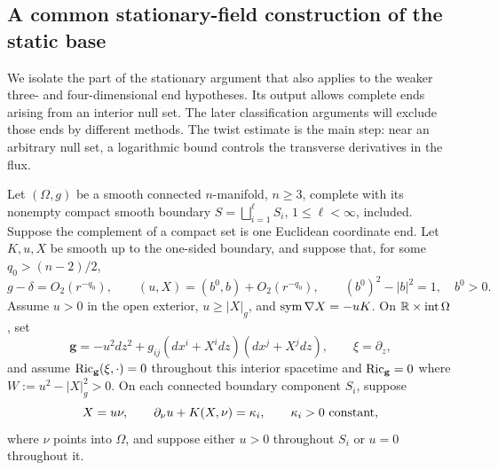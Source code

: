 \subsection{A common stationary-field construction of the static base}
\label{subsec:static:common-base}

We isolate the part of the stationary argument that also applies to
the weaker three- and four-dimensional end hypotheses.  Its output
allows complete ends arising from an interior null set.  The later
classification arguments will exclude those ends by different methods.
The twist estimate is the main step: near an arbitrary null set, a
logarithmic bound controls the transverse derivatives in the flux.

\begin{proposition}
\label{prop:static:common-base}
Let $(\Omega,g)$ be a smooth connected $n$-manifold, $n\geq3$,
complete with its nonempty compact smooth boundary
$S=\bigsqcup_{i=1}^{\ell}S_i$, $1\leq\ell<\infty$, included.
Suppose the complement of a compact
set is one Euclidean coordinate end.  Let $K,u,X$ be smooth up to
the one-sided boundary, and suppose that, for some $q_0>(n-2)/2$,
\[
 g-\delta=O_2(r^{-q_0}),\qquad
 (u,X)=(b^0,b)+O_2(r^{-q_0}),\qquad
 (b^0)^2-|b|^2=1,\quad b^0>0.
\]
Assume $u>0$ in the open exterior, $u\geq|X|_g$, and
$\operatorname{sym}\nabla X=-uK$.  On $\mathbb R\times\operatorname{int}\Omega$, set
\[
 \mathbf g=-u^2dz^2+g_{ij}(dx^i+X^i dz)(dx^j+X^j dz),
 \qquad \xi=\partial_z,
\]
and assume $\operatorname{Ric}_{\mathbf g}(\xi,\cdot)=0$ throughout this
interior spacetime and
$\operatorname{Ric}_{\mathbf g}=0$ where $W:=u^2-|X|_g^2>0$.
On each connected boundary component $S_i$, suppose
\[
 X=u\nu,\qquad \partial_\nu u+K(X,\nu)=\kappa_i,
 \qquad \kappa_i>0\ \hbox{constant},
\]
where $\nu$ points into $\Omega$, and suppose either $u>0$
throughout $S_i$ or $u=0$ throughout it.


\end{proposition}
